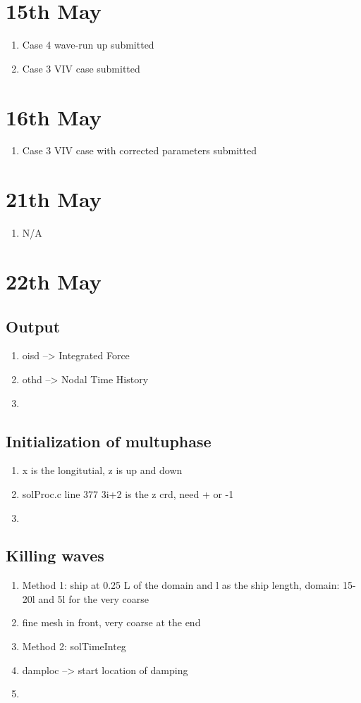 \documentclass[12pt]{article} %
\begin{document}
\section{15th May}
\begin{enumerate}
    \item Case 4 wave-run up submitted
    \item Case 3 VIV case submitted
\end{enumerate}

\section{16th May}
\begin{enumerate}
    \item Case 3 VIV case with corrected parameters submitted
\end{enumerate}

\section{21th May}
\begin{enumerate}
    \item N/A
\end{enumerate}
\section{22th May}
\subsection{Output}
\begin{enumerate}
    \item oisd --> Integrated Force
    \item othd --> Nodal Time History
    \item 
\end{enumerate}
\subsection{Initialization of multuphase}
\begin{enumerate}
    \item x is the longitutial, z is up and down
    \item solProc.c line  377 3i+2 is the z crd, need + or -1
    \item 
\end{enumerate}
\subsection{Killing waves}
\begin{enumerate}
    \item Method 1: ship at 0.25 L of the domain and l as the ship length, domain: 15-20l and 5l for the very coarse
    \item fine mesh in front, very coarse at the end
    \item Method 2: solTimeInteg
    \item damploc --> start location of damping
    \item 
\end{enumerate}
\end{document}
